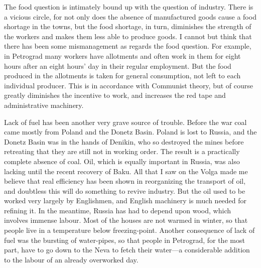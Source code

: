 The food question is intimately bound up with the question of industry. There is a vicious circle, for not only does the absence of manufactured goods cause a food shortage in the towns, but the food shortage, in turn, diminishes the strength of the workers and makes them less able to produce goods. I cannot but think that there has been some mismanagement as regards the food question. For example, in Petrograd many workers have allotments and often work in them for eight hours after an eight hours' day in their regular employment. But the food produced in the allotments is taken for general consumption, not left to each individual producer. This is in accordance with Communist theory, but of course greatly diminishes the incentive to work, and increases the red tape and administrative machinery.

Lack of fuel has been another very grave source of trouble. Before the war coal came mostly from Poland and the Donetz Basin. Poland is lost to Russia, and the Donetz Basin was in the hands of Denikin, who so destroyed the mines before retreating that they are still not in working order. The result is a practically complete absence of coal. Oil, which is equally important in Russia, was also lacking until the recent recovery of Baku. All that I saw on the Volga made me believe that real efficiency has been shown in reorganizing the transport of oil, and doubtless this will do something to revive industry. But the oil used to be worked very largely by Englishmen, and English machinery is much needed for refining it. In the meantime, Russia has had to depend upon wood, which involves immense labour. Most of the houses are not warmed in winter, so that people live in a temperature below freezing-point. Another consequence of lack of fuel was the bursting of water-pipes, so that people in Petrograd, for the most part, have to go down to the Neva to fetch their water---a considerable addition to the labour of an already overworked day.

